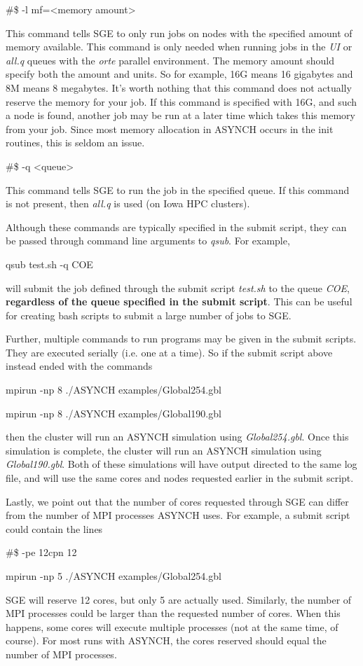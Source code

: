 \documentclass[12pt]{article}
\newenvironment{codeindent}
{\begin{list}{}
        {\setlength{\leftmargin}{.1in}}
        \item[]
}
{\end{list}}
\begin{document}
\begin{codeindent}
 \#\$ -l mf=<memory amount>
\end{codeindent}
This command tells SGE to only run jobs on nodes with the specified amount of memory available. This command is only needed when running jobs in the \emph{UI} or \emph{all.q} queues with the \emph{orte} parallel environment. The memory amount should specify both the amount and units. So for example, 16G means 16 gigabytes and 8M means 8 megabytes. It's worth nothing that this command does not actually reserve the memory for your job. If this command is specified with 16G, and such a node is found, another job may be run at a later time which takes this memory from your job. Since most memory allocation in ASYNCH occurs in the init routines, this is seldom an issue.

\begin{codeindent}
 \#\$ -q <queue>
\end{codeindent}
This command tells SGE to run the job in the specified queue. If this command is not present, then \emph{all.q} is used (on Iowa HPC clusters).

Although these commands are typically specified in the submit script, they can be passed through command line arguments to \emph{qsub}. For example,
\begin{codeindent}
 qsub test.sh -q COE
\end{codeindent}
will submit the job defined through the submit script \emph{test.sh} to the queue \emph{COE}, \textbf{regardless of the queue specified in the submit script}. This can be useful for creating bash scripts to submit a large number of jobs to SGE.

Further, multiple commands to run programs may be given in the submit scripts. They are executed serially (i.e. one at a time). So if the submit script above instead ended with the commands
\begin{codeindent}
 mpirun -np 8 ./ASYNCH examples/Global254.gbl
 
 mpirun -np 8 ./ASYNCH examples/Global190.gbl
\end{codeindent}
then the cluster will run an ASYNCH simulation using \emph{Global254.gbl}. Once this simulation is complete, the cluster will run an ASYNCH simulation using \emph{Global190.gbl}. Both of these simulations will have output directed to the same log file, and will use the same cores and nodes requested earlier in the submit script.

Lastly, we point out that the number of cores requested through SGE can differ from the number of MPI processes ASYNCH uses. For example, a submit script could contain the lines
\begin{codeindent}
 \#\$ -pe 12cpn 12

 mpirun -np 5 ./ASYNCH examples/Global254.gbl
\end{codeindent}
SGE will reserve 12 cores, but only 5 are actually used. Similarly, the number of MPI processes could be larger than the requested number of cores. When this happens, some cores will execute multiple processes (not at the same time, of course). For most runs with ASYNCH, the cores reserved should equal the number of MPI processes.
\end{document}
